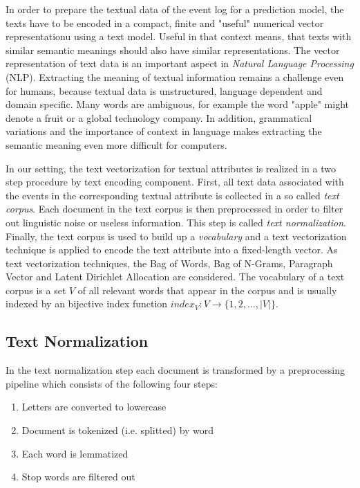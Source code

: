 In order to prepare the textual data of the event log for a prediction model, the texts have to be encoded in a compact, finite and "useful" numerical vector representationu using a text model.
Useful in that context means, that texts with similar semantic meanings should also have similar representations.
The vector representation of text data is an important aspect in \textit{Natural Language Processing} (NLP).
Extracting the meaning of textual information remains a challenge even for humans, because textual data is unstructured, language dependent and domain specific.
Many words are ambiguous, for example the word "apple" might denote a fruit or a global technology company.
In addition, grammatical variations and the importance of context in language makes extracting the semantic meaning even more difficult for computers.

In our setting, the text vectorization for textual attributes is realized in a two step procedure by text encoding component.
First, all text data associated with the events in the corresponding textual attribute is collected in a so called \textit{text corpus}.
Each document in the text corpus is then preprocessed in order to filter out linguistic noise or useless information.
This step is called \textit{text normalization}.
Finally, the text corpus is used to build up a \textit{vocabulary} and a text vectorization technique is applied to encode the text attribute into a fixed-length vector.
As text vectorization techniques, the Bag of Words, Bag of N-Grams, Paragraph Vector and Latent Dirichlet Allocation are considered.
The vocabulary of a text corpus is a set $V$ of all relevant words that appear in the corpus and is usually indexed by an bijective index function $index_V \colon V \to \{1, 2, \dots, |V|\}$.


\subsection{Text Normalization}

In the text normalization step each document is transformed by a preprocessing pipeline which consists of the following four steps:

\begin{enumerate} 
	\item Letters are converted to lowercase
	\item Document is tokenized (i.e. splitted) by word
	\item Each word is lemmatized
	\item Stop words are filtered out
\end{enumerate}

